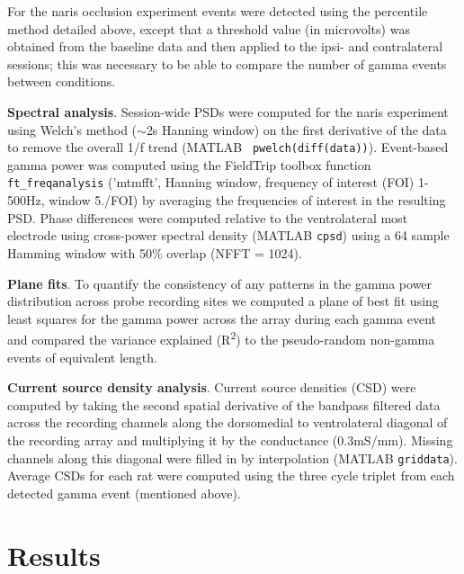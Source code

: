 \documentclass[11pt]{article}
\begin{document}
For the naris occlusion experiment events were detected using the
percentile method detailed above, except that a threshold value (in
microvolts) was obtained from the baseline data and then applied to
the ipsi- and contralateral sessions; this was necessary to be able to
compare the number of gamma events between conditions.

{\bf Spectral analysis}. Session-wide PSDs were computed for the naris
experiment using Welch's method ($\sim$2s Hanning window) on the first
derivative of the data to remove the overall 1/f trend (MATLAB {\tt
  pwelch(diff(data))}).  Event-based gamma power was computed using
the FieldTrip toolbox \citep{Oostenveld2011} function {\tt
  ft\_freqanalysis} ('mtmfft', Hanning window, frequency of interest
(FOI) 1-500Hz, window 5./FOI) by averaging the frequencies of interest
in the resulting PSD. Phase differences were computed relative to the
ventrolateral most electrode using cross-power spectral density
(MATLAB {\tt cpsd}) using a 64 sample Hamming window with 50\% overlap
(NFFT = 1024).


{\bf Plane fits}. To quantify the consistency of any patterns in the
gamma power distribution across probe recording sites we computed a
plane of best fit using least squares for the gamma power across the
array during each gamma event and compared the variance explained
(R\textsuperscript{2}) to the pseudo-random non-gamma events of
equivalent length.

{\bf Current source density analysis}. Current source densities (CSD)
were computed by taking the second spatial derivative of the bandpass
filtered data across the recording channels along the dorsomedial to
ventrolateral diagonal of the recording array and multiplying it by
the conductance (0.3mS/mm).  Missing channels along this diagonal were
filled in by interpolation (MATLAB {\tt griddata}). Average CSDs for
each rat were computed using the three cycle triplet from each
detected gamma event (mentioned above). %

\section*{Results}

\end{document}
